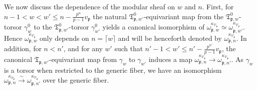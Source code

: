 \documentclass[11pt]{amsart}
\theoremstyle{definition} %
\theoremstyle{plain} %
\theoremstyle{remark} %
\newcommand{\cV}{{\mathcal V}}
\newcommand{\frakT}{\mathfrak T}
\newcommand{\frakp}{\mathfrak p}
\begin{document}
We now discuss the dependence of the modular sheaf on $w$ and $n$. First, for 
 $n-1<w<w'\leqslant n-\frac{p^n}{p-1}v_\frakp$ the natural  $\frakT^0_{\frakp,w'}$-equivariant map from the $\frakT^0_{\frakp,w}$-torsor $\gamma^0_{w}$ to the $\frakT^0_{\frakp,w'}$-torsor $\gamma^0_{w'}$ yields a canonical  isomorphism of $\omega_{\frakp,w}^{\kappa_{\cV_\frakp}}\simeq\omega_{\frakp,w'}^{\kappa_{\cV_\frakp}}$.
Hence $\omega_{\frakp,w}^{\kappa_{\cV_\frakp}}$ only depends on $n=\lceil w\rceil$ and will be henceforth denoted by $\omega_{\frakp,n}^{\kappa_{\cV_\frakp}}$.
In addition, for $n<n'$, and for any $w'$ such that $n'-1<w'\leqslant n'-\frac{p^{n'}}{p-1}v_\frakp$, the
 canonical $\frakT_{\frakp,w'}$-equivariant map from $\gamma_w$ to $\gamma_{w'}$ induces a map $\omega_{\frakp,n}^{\kappa_{\cV_\frakp}} \rightarrow \omega_{\frakp,n'}^{\kappa_{\cV_\frakp}}$.
As $\gamma_w$ is a torsor when restricted to the generic fiber, we have an isomorphism $\omega_{\frakp,n}^{\kappa_{\cV_\frakp}} \xrightarrow{\sim} \omega_{\frakp,n'}^{\kappa_{\cV_\frakp}}$ over the generic fiber.
\end{document}
